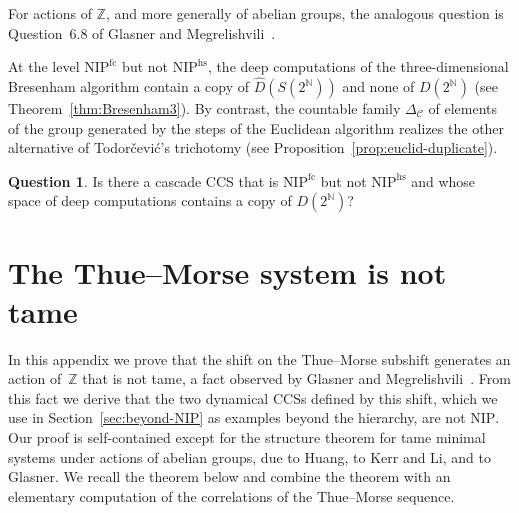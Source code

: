 \documentclass[psamsfonts]{amsart}
\theoremstyle{definition}
\newtheorem{question}[thm]{Question}
\theoremstyle{remark}
\newcommand{\NIP}{\text{NIP}}
\numberwithin{equation}{section}
\begin{document}
For actions of $\mathbb{Z}$, and more generally of abelian groups, the analogous question is Question~6.8 of Glasner and Megrelishvili~\cite{glasner2022tame}.

At the level $\NIP^{\mathrm{fc}}$ but not $\NIP^{\mathrm{hs}}$, the deep computations of the three-dimensional Bresenham algorithm contain a copy of $\hat D(S(2^{\mathbb{N}}))$ and none of $D(2^{\mathbb{N}})$ (see Theorem~\ref{thm:Bresenham3}).
By contrast, the countable family $\Delta_{\mathcal{C}}$ of elements of the group generated by the steps of the Euclidean algorithm realizes the other alternative of Todorčević’s trichotomy (see Proposition~\ref{prop:euclid-duplicate}).

\begin{question}\label{q:cascade-duplicate}
  Is there a cascade CCS that is $\NIP^{\mathrm{fc}}$ but not $\NIP^{\mathrm{hs}}$ and whose space of deep computations contains a copy of $D(2^{\mathbb{N}})$?
\end{question}

\appendix

\section{The Thue--Morse system is not tame}
\label{app:thue-morse}

In this appendix we prove that the shift on the Thue--Morse subshift generates an action of~$\mathbb{Z}$ that is not tame, a fact observed by Glasner and Megrelishvili~\cite{GlasnerMegrelishvili2018}.
From this fact we derive that the two dynamical CCSs defined by this shift, which we use in Section~\ref{sec:beyond-NIP} as examples beyond the hierarchy, are not $\NIP$.
Our proof is self-contained except for the structure theorem for tame minimal systems under actions of abelian groups, due to Huang, to Kerr and Li, and to Glasner.
We recall the theorem below and combine the theorem with an elementary computation of the correlations of the Thue--Morse sequence.
\end{document}
